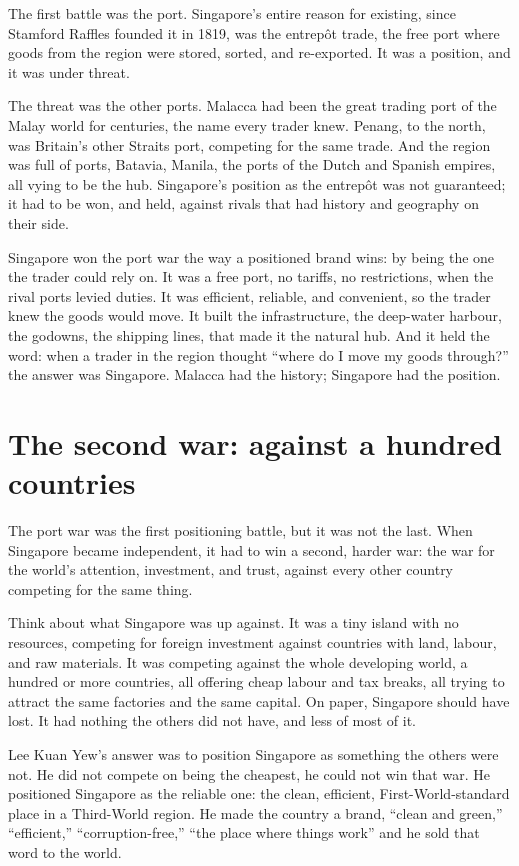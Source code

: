 \documentclass[10pt,twoside,openany]{memoir}
\newcommand{\needspacehead}{\needspace{4\baselineskip}}
\let\oldsection\section
\renewcommand{\section}{\needspacehead\oldsection}
\begin{document}
The first battle was the port. Singapore's entire reason for existing,
since Stamford Raffles founded it in 1819, was the entrepôt trade, the
free port where goods from the region were stored, sorted, and
re-exported. It was a position, and it was under threat.

The threat was the other ports. Malacca had been the great trading port
of the Malay world for centuries, the name every trader knew. Penang, to
the north, was Britain's other Straits port, competing for the same
trade. And the region was full of ports, Batavia, Manila, the ports of
the Dutch and Spanish empires, all vying to be the hub. Singapore's
position as the entrepôt was not guaranteed; it had to be won, and held,
against rivals that had history and geography on their side.

Singapore won the port war the way a positioned brand wins: by being the
one the trader could rely on. It was a free port, no tariffs, no
restrictions, when the rival ports levied duties. It was efficient,
reliable, and convenient, so the trader knew the goods would move. It
built the infrastructure, the deep-water harbour, the godowns, the
shipping lines, that made it the natural hub. And it held the word: when
a trader in the region thought ``where do I move my goods through?'' the
answer was Singapore. Malacca had the history; Singapore had the
position.

\section{The second war: against a hundred
countries}\label{the-second-war-against-a-hundred-countries}

The port war was the first positioning battle, but it was not the last.
When Singapore became independent, it had to win a second, harder war:
the war for the world's attention, investment, and trust, against every
other country competing for the same thing.

Think about what Singapore was up against. It was a tiny island with no
resources, competing for foreign investment against countries with land,
labour, and raw materials. It was competing against the whole developing
world, a hundred or more countries, all offering cheap labour and tax
breaks, all trying to attract the same factories and the same capital.
On paper, Singapore should have lost. It had nothing the others did not
have, and less of most of it.

Lee Kuan Yew's answer was to position Singapore as something the others
were not. He did not compete on being the cheapest, he could not win
that war. He positioned Singapore as the reliable one: the clean,
efficient, First-World-standard place in a Third-World region. He made
the country a brand, ``clean and green,'' ``efficient,''
``corruption-free,'' ``the place where things work'' and he sold that
word to the world.
\end{document}
